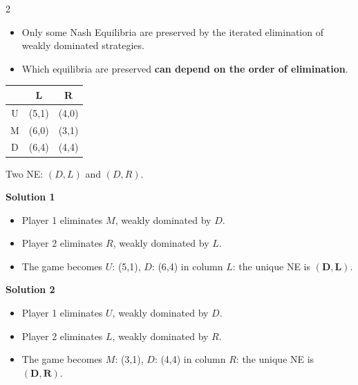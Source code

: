 \documentclass[a4paper,9pt]{extarticle}
\begin{document}
\begin{multicols}{2}
\begin{warning}
\begin{itemize}

\item Only some Nash Equilibria are preserved by the iterated elimination of weakly
dominated strategies.

\item Which equilibria are preserved \textbf{can depend on the order of elimination}.

\end{itemize}

\end{warning}


\begin{example}

\begin{center}
\begin{tabular}{c|cc}
 & L & R \\
\hline
U & (5,1) & (4,0) \\
M & (6,0) & (3,1) \\
D & (6,4) & (4,4) \\
\end{tabular}
\end{center}

Two NE: $(D,L)$ and $(D,R)$.

\textbf{Solution 1}

\begin{itemize}

\item Player 1 eliminates $M$, weakly dominated by $D$.

\item Player 2 eliminates $R$, weakly dominated by $L$.

\item The game becomes $U$: (5,1), $D$: (6,4) in column $L$: the unique NE is
$\boldsymbol{(D,L)}$.

\end{itemize}

\textbf{Solution 2}

\begin{itemize}

\item Player 1 eliminates $U$, weakly dominated by $D$.

\item Player 2 eliminates $L$, weakly dominated by $R$.

\item The game becomes $M$: (3,1), $D$: (4,4) in column $R$: the unique NE is
$\boldsymbol{(D,R)}$.


\end{itemize}
\end{example}
\end{multicols}
\end{document}
